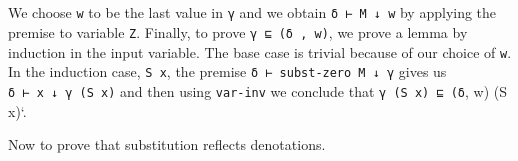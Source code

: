 \begin{fence}
\begin{code}
\AgdaSpace{}%
\AgdaSpace{}%
\AgdaSpace{}%
\<%
\\
\>[0][@{}l@{\AgdaIndent{0}}]%
\>[2]\<%
\\
%
\>[2]\AgdaSpace{}%
\AgdaSymbol{:}\AgdaSpace{}%
\AgdaSpace{}%
\AgdaSpace{}%
\AgdaSymbol{(}\AgdaSpace{}%
\AgdaSpace{}%
\AgdaSpace{}%
\AgdaSymbol{)}\<%
\\
%
\>[2]\AgdaSpace{}%
%
\>[11]\AgdaSymbol{=}%
\>[14]\<%
\\
%
\>[2]\AgdaSpace{}%
\AgdaSymbol{(}\AgdaSpace{}%
\AgdaSymbol{)}\AgdaSpace{}%
\AgdaSymbol{=}\AgdaSpace{}%
\AgdaSpace{}%
\AgdaSymbol{(}\AgdaSpace{}%
\AgdaSymbol{(}\AgdaSpace{}%
\AgdaSymbol{))}\<%
\end{code}
\end{fence}

We choose \texttt{w} to be the last value in \texttt{γ} and we obtain
\texttt{δ\ ⊢\ M\ ↓\ w} by applying the premise to variable \texttt{Z}.
Finally, to prove \texttt{γ\ ⊑\ (δ\ ,\ w)}, we prove a lemma by
induction in the input variable. The base case is trivial because of our
choice of \texttt{w}. In the induction case, \texttt{S\ x}, the premise
\texttt{δ\ ⊢\ subst-zero\ M\ ↓\ γ} gives us
\texttt{δ\ ⊢\ x\ ↓\ γ\ (S\ x)} and then using \texttt{var-inv} we
conclude that \texttt{γ\ (S\ x)\ ⊑\ (δ}, w) (S x)`.

Now to prove that substitution reflects denotations.

